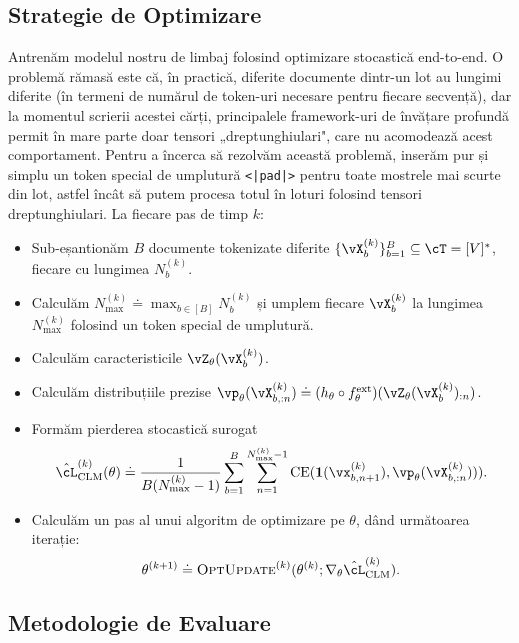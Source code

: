 \documentclass[../../book-main_ro.tex]{subfiles}
\begin{document}
\subsection{Strategie de Optimizare}

Antrenăm modelul nostru de limbaj folosind optimizare stocastică end-to-end. O problemă rămasă este că, în practică, diferite documente dintr-un lot au lungimi diferite (în termeni de numărul de token-uri necesare pentru fiecare secvență), dar la momentul scrierii acestei cărți, principalele framework-uri de învățare profundă permit în mare parte doar tensori „dreptunghiulari", care nu acomodează acest comportament. Pentru a încerca să rezolvăm această problemă, inserăm pur și simplu un token special de umplutură \texttt{<|pad|>} pentru toate mostrele mai scurte din lot, astfel încât să putem procesa totul în loturi folosind tensori dreptunghiulari. La fiecare pas de timp \(k\):
\begin{itemize}
    \item Sub-eșantionăm \(B\) documente tokenizate diferite \(\{\vX_{b}^{(k)}\}_{b = 1}^{B} \subseteq \cT = [V]^{*}\), fiecare cu lungimea \(N_{b}^{(k)}\).
    \item Calculăm \(N_{\max}^{(k)} \doteq \max_{b \in [B]}N_{b}^{(k)}\) și umplem fiecare \(\vX_{b}^{(k)}\) la lungimea \(N_{\max}^{(k)}\) folosind un token special de umplutură.
    \item Calculăm caracteristicile \(\vZ_{\theta}(\vX_{b}^{(k)})\).
    \item Calculăm distribuțiile prezise \(\vp_{\theta}(\vX_{b, :n}^{(k)}) \doteq (h_{\theta} \circ f_{\theta}^{\ext})(\vZ_{\theta}(\vX_{b}^{(k)})_{:n})\).
    \item Formăm pierderea stocastică surogat
    \begin{equation}
        \hat{\cL}_{\mathrm{CLM}}^{(k)}(\theta) \doteq \frac{1}{B(N_{\max}^{(k)} - 1)}\sum_{b = 1}^{B}\sum_{n = 1}^{N_{\max}^{(k)}-1}\CE(\vone(\vx_{b, n + 1}^{(k)}), \vp_{\theta}(\vX_{b, :n}^{(k)}))).
    \end{equation}
    \item Calculăm un pas al unui algoritm de optimizare pe \(\theta\), dând următoarea iterație:
    \begin{equation}
        \theta^{(k + 1)} \doteq \textsc{OptUpdate}^{(k)}(\theta^{(k)}; \nabla_{\theta}\hat{\cL}_{\mathrm{CLM}}^{(k)}).
    \end{equation}
\end{itemize}

\subsection{Metodologie de Evaluare} \label{sub:clm_text_evals}
\end{document}
